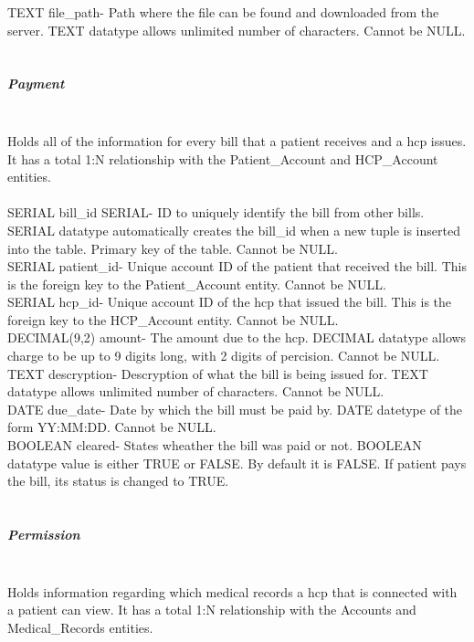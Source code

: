 \documentclass[12pt]{report}
\begin{document}
TEXT file_path- Path where the file can be found and downloaded from the server.  TEXT datatype allows unlimited number of characters.  Cannot be NULL.\\ \\

\subparagraph{Payment}\\
Holds all of the information for every bill that a patient receives and a hcp issues.  It has a total 1:N relationship with the Patient_Account and HCP_Account entities.\\ \\

SERIAL bill_id SERIAL-  ID to uniquely identify the bill from other bills. SERIAL datatype automatically creates the bill_id when a new tuple is inserted into the table.  Primary key of the table.  Cannot be NULL.\\

SERIAL patient_id- Unique account ID of the patient that received the bill.  This is the foreign key to the Patient_Account entity.  Cannot be NULL.\\

SERIAL hcp_id- Unique account ID of the hcp that issued the bill.  This is the foreign key to the HCP_Account entity.  Cannot be NULL.\\

DECIMAL(9,2) amount- The amount due to the hcp.  DECIMAL datatype allows charge to be up to 9 digits long, with 2 digits of percision.  Cannot be NULL.\\
 
TEXT descryption- Descryption of what the bill is being issued for.  TEXT datatype allows unlimited number of characters. Cannot be NULL.\\

DATE due_date- Date by which the bill must be paid by.  DATE datetype of the form YY:MM:DD.  Cannot be NULL.\\

BOOLEAN cleared- States wheather the bill was paid or not.  BOOLEAN datatype value is either TRUE or FALSE.  By default it is FALSE.  If patient pays the bill, its status is changed to TRUE.\\ \\

\subparagraph{Permission}\\
Holds information regarding which medical records a hcp that is connected with a patient can view.  It has a total 1:N relationship with the Accounts and Medical_Records entities.\\ \\
\end{document}
